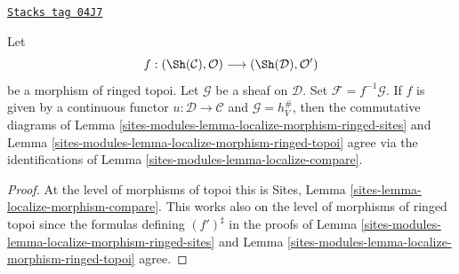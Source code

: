 \begin{lemma}
\label{sites-modules-lemma-localize-morphism-compare}
\href{https://stacks.math.columbia.edu/tag/04J7}{\texttt{Stacks tag 04J7}}

Let
$$
f :
(\Sh(\mathcal{C}), \mathcal{O})
\longrightarrow
(\Sh(\mathcal{D}), \mathcal{O}')
$$
be a morphism of ringed topoi.
Let $\mathcal{G}$ be a sheaf on $\mathcal{D}$.
Set $\mathcal{F} = f^{-1}\mathcal{G}$.
If $f$ is given by a continuous functor $u : \mathcal{D} \to \mathcal{C}$
and $\mathcal{G} = h_V^\#$, then the commutative diagrams of
Lemma \ref{sites-modules-lemma-localize-morphism-ringed-sites}
and
Lemma \ref{sites-modules-lemma-localize-morphism-ringed-topoi}
agree via the identifications of
Lemma \ref{sites-modules-lemma-localize-compare}.
\end{lemma}

\begin{proof}
At the level of morphisms of topoi this is
Sites, Lemma \ref{sites-lemma-localize-morphism-compare}.
This works also on the level of morphisms of ringed topoi since
the formulas defining $(f')^\sharp$ in the proofs of
Lemma \ref{sites-modules-lemma-localize-morphism-ringed-sites}
and
Lemma \ref{sites-modules-lemma-localize-morphism-ringed-topoi}
agree.
\end{proof}

